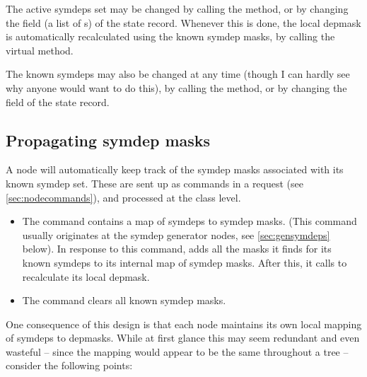   The active symdeps set may be changed by calling the 
  method, or by changing the  field (a list of s)
  of the state record. Whenever this is done, the local depmask is
  automatically recalculated using the known symdep masks, by calling the
  virtual  method.

  The known symdeps may also be changed at any time (though I can hardly see
  why anyone would want to do this), by calling the 
  method, or by changing the   field of the state record. 
  
\subsection{Propagating symdep masks}

  A node will automatically keep track of the symdep masks associated with its
  known symdep set. These are sent up as commands in a request (see
  \ref{sec:nodecommands}), and processed at the  class level.

  \begin{itemize}
  
  \item The  command contains a map of symdeps to symdep
    masks. (This command usually originates at the symdep generator nodes, see
    \ref{sec:gensymdeps} below). In response to this command,  adds
    all the masks it finds for its known symdeps to its internal map of symdep
    masks. After this, it calls  to recalculate its
    local depmask. 

  \item The  command clears all known symdep masks.
  
  \end{itemize}
  
  One consequence of this design is that each node maintains its own local
  mapping of symdeps to depmasks. While at first glance this may seem redundant
  and even wasteful -- since the mapping would appear to be the same throughout
  a tree -- consider the following points:

